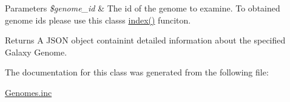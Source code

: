 \begin{DoxyParams}{Parameters}
{\em \$genome\+\_\+id} & The id of the genome to examine. To obtained genome id\textquotesingle{}s please use this class\textquotesingle{}s \hyperlink{classGenomes_a52b51e90995539b8defb2571edd14437}{index()} funciton.\\
\hline
\end{DoxyParams}
\begin{DoxyReturn}{Returns}
A J\+S\+ON object containint detailed information about the specified Galaxy Genome. 
\end{DoxyReturn}


The documentation for this class was generated from the following file\+:\begin{DoxyCompactItemize}
\item 
\hyperlink{Genomes_8inc}{Genomes.\+inc}\end{DoxyCompactItemize}
